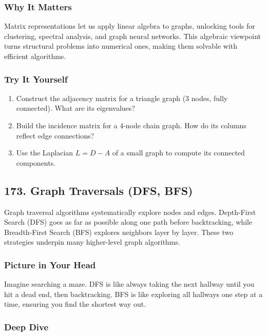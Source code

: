 \documentclass[
  letterpaper,
  DIV=11,
  numbers=noendperiod]{scrreprt}
\providecommand{\tightlist}{%
  \setlength{\itemsep}{0pt}\setlength{\parskip}{0pt}}
\begin{document}
\subsubsection{Why It Matters}\label{why-it-matters-69}

Matrix representations let us apply linear algebra to graphs, unlocking
tools for clustering, spectral analysis, and graph neural networks. This
algebraic viewpoint turns structural problems into numerical ones,
making them solvable with efficient algorithms.

\subsubsection{Try It Yourself}\label{try-it-yourself-171}

\begin{enumerate}
\def\labelenumi{\arabic{enumi}.}
\tightlist
\item
  Construct the adjacency matrix for a triangle graph (3 nodes, fully
  connected). What are its eigenvalues?
\item
  Build the incidence matrix for a 4-node chain graph. How do its
  columns reflect edge connections?
\item
  Use the Laplacian \(L=D-A\) of a small graph to compute its connected
  components.
\end{enumerate}

\subsection{173. Graph Traversals (DFS,
BFS)}\label{graph-traversals-dfs-bfs}

Graph traversal algorithms systematically explore nodes and edges.
Depth-First Search (DFS) goes as far as possible along one path before
backtracking, while Breadth-First Search (BFS) explores neighbors layer
by layer. These two strategies underpin many higher-level graph
algorithms.

\subsubsection{Picture in Your Head}\label{picture-in-your-head-172}

Imagine searching a maze. DFS is like always taking the next hallway
until you hit a dead end, then backtracking. BFS is like exploring all
hallways one step at a time, ensuring you find the shortest way out.

\subsubsection{Deep Dive}\label{deep-dive-172}
\end{document}
